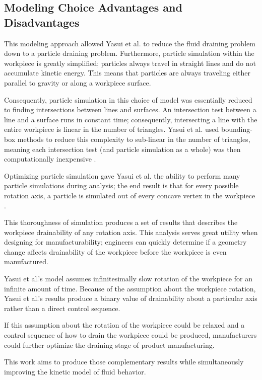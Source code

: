 	\subsection{Modeling Choice Advantages and Disadvantages}

This modeling approach allowed Yasui et al. to reduce the fluid draining problem down to a particle draining problem. Furthermore, particle simulation within the workpiece is greatly simplified; particles always travel in straight lines and do not accumulate kinetic energy. This means that particles are always traveling either parallel to gravity or along a workpiece surface.

Consequently, particle simulation in this choice of model was essentially reduced to finding intersections between lines and surfaces. An intersection test between a line and a surface runs in constant time; consequently, intersecting a line with the entire workpiece is linear in the number of triangles. Yasui et al. used bounding-box methods to reduce this complexity to sub-linear in the number of triangles, meaning each intersection test (and particle simulation as a whole) was then computationally inexpensive \cite{Yasui2011}.

Optimizing particle simulation gave Yasui et al. the ability to perform many particle simulations during analysis; the end result is that for every possible rotation axis, a particle is simulated out of every concave vertex in the workpiece \cite{Yasui2011}.

This thoroughness of simulation produces a set of results that describes the workpiece drainability of any rotation axis. This analysis serves great utility when designing for manufacturability; engineers can quickly determine if a geometry change affects drainability of the workpiece before the workpiece is even manufactured.

Yasui et al.'s model assumes infinitesimally slow rotation of the workpiece for an infinite amount of time. Because of the assumption about the workpiece rotation, Yasui et al.'s results produce a binary value of drainability about a particular axis rather than a direct control sequence.

If this assumption about the rotation of the workpiece could be relaxed and a  control sequence of how to drain the workpiece could be produced, manufacturers could further optimize the draining stage of product manufacturing.

This work aims to produce those complementary results while simultaneously improving the kinetic model of fluid behavior.

